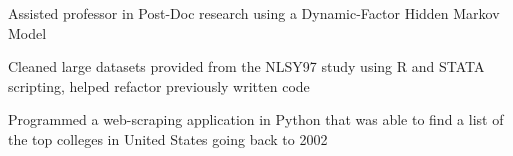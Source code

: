 \documentclass[letterpaper]{deedy-resume}
\begin{document}
\begin{minipage}[t]{0.65\textwidth}
\begin{tightitemize}
\item Assisted professor in Post-Doc research using a Dynamic-Factor Hidden Markov Model \\
\item Cleaned large datasets provided from the NLSY97 study using R and STATA scripting, helped refactor previously written code\\
\item Programmed a web-scraping application in Python that was able to find a list of the top colleges in United States going back to 2002\\ 
\end{tightitemize}
\sectionspace 

\end{minipage}
\end{document}
